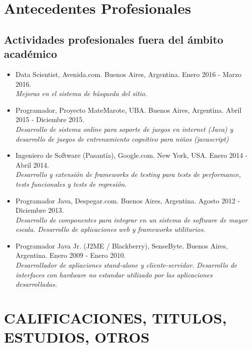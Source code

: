 \documentclass[a4paper,10pt]{article}
\begin{document}
\section{Antecedentes Profesionales}

\subsection{Actividades profesionales fuera del ámbito académico}

\begin{itemize}
    \item {Data Scientist, Avenida.com. Buenos Aires, Argentina.
            Enero 2016 - Marzo 2016. \\
            {\small \itshape Mejoras en el sistema de búsqueda del sitio.}}

    \item {Programador, Proyecto MateMarote, UBA. Buenos Aires, Argentina.
            Abril 2015 - Diciembre 2015. \\
            {\small \itshape Desarrollo de sistema online para soporte de
        juegos en internet (Java) y desarrollo de juegos de entrenamiento
cognitivo para niños (javascript)}}

    \item {Ingeniero de Software (Pasantía), Google.com. New York, USA. Enero
            2014 - Abril 2014. \\ 
    {\small \itshape Desarrollo y extensión de frameworks de testing para tests
de performance, tests funcionales y tests de regresión.}}

    \item {Programador Java, Despegar.com. Buenos Aires, Argentina. Agosto 2012
           - Diciembre 2013. \\
    {\small \itshape Desarrollo de componentes para integrar en un sistema de
software de mayor escala. Desarrollo de aplicaciones web y frameworks
utilitarios.}}

    \item {Programador Java Jr. (J2ME / Blackberry), SenseByte. Buenos Aires,
            Argentina. Enero 2009 - Enero 2010. \\ 
    {\small \itshape Desarrollador de apliaciones stand-alone y
cliente-servidor.  Desarrollo de interfaces con hardware no estandar utilizado
por las aplicaciones desarrolladas.}}

\end{itemize}

\section{CALIFICACIONES, TITULOS, ESTUDIOS, OTROS}
\end{document}
